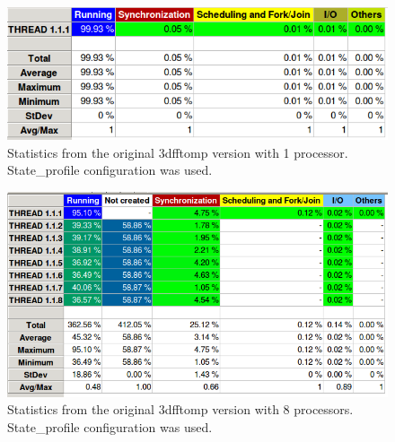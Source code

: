 \documentclass[12]{article}
\begin{document}
\begin{figure}[H]
\centering  \includegraphics[width=\linewidth]{images/3dfftomp_original_1.png}
  \caption{Statistics from the original 3dfftomp version with 1 processor. State\_profile configuration was used.}
  \label{fig:3dfftomp_original_1}
\end{figure}



\begin{figure}[H]
\centering  \includegraphics[width=\linewidth]{images/3dfftomp_original_8.png}
  \caption{Statistics from the original 3dfftomp version with 8 processors. State\_profile configuration was used.}
  \label{fig:3dfftomp_original_8}
\end{figure}





\end{document}

